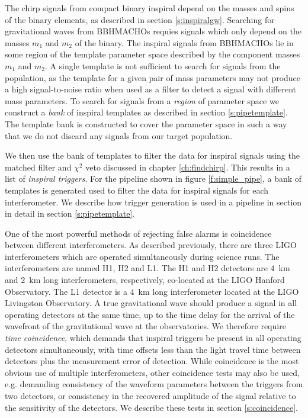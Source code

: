 The chirp signals from compact binary inspiral depend on the masses and spins
of the binary elements, as described in section \ref{s:inspiralgw}. Searching
for gravitational waves from BBHMACHOs requies signals which only depend on
the masses $m_1$ and $m_2$ of the binary.  The inspiral signals from BBHMACHOs
lie in some region of the template parameter space described by the component
masses $m_1$ and $m_2$. A single template is not sufficient to search for
signals from the population, as the template for a given pair of mass
parameters may not produce a high signal-to-noise ratio when used as a filter
to detect a signal with different mass parameters.  To search for signals from
a \emph{region} of parameter space we construct a \emph{bank} of inspiral
templates as described in section \ref{s:pipetemplate}. The template bank is
constructed to cover the parameter space in such a way that we do not discard
any signals from our target population.

We then use the bank of templates to filter the data for inspiral signals using
the matched filter and $\chi^2$ veto discussed in chapter \ref{ch:findchirp}.
This results in a list of \emph{inspiral triggers}. For the pipeline shown in
figure \ref{f:simple_pipe}, a bank of templates is generated used to filter
the data for inspiral signals for each interferometer. We describe how trigger
generation is used in a pipeline in section in detail in section
\ref{s:pipetemplate}.

One of the most powerful methods of rejecting false alarms is coincidence
between different interferometers. As described previously, there are three
LIGO interferometers which are operated simultaneously during science runs.
The interferometers are named H1, H2 and L1. The H1 and H2 detectors are
$4$~km and $2$~km long interferometers, respectively, co-located at the LIGO
Hanford Observatory. The L1 detector is a $4$~km long interferometer located
at the LIGO Livingston Observatory. A true gravitational wave should produce a
signal in all operating detectors at the same time, up to the time delay for
the arrival of the wavefront of the gravitational wave at the observatories.
We therefore require \emph{time coincidence}, which demands that inspiral
triggers be present in all operating detectors simultaneously, with time
offsets less than the light travel time between detectors plus the measurement
error of detection. While coincidence is the most obvious use of multiple
interferometers, other coincidence tests may also be used, e.g. demanding
consistency of the waveform parameters between the triggers from two
detectors, or consistency in the recovered amplitude of the signal relative to
the sensitivity of the detectors. We describe these tests in section
\ref{s:coincidence}.

